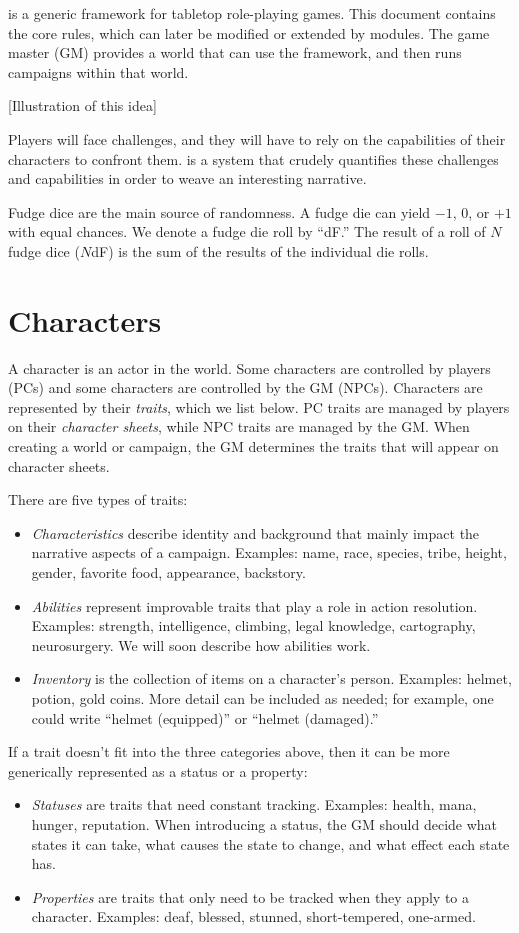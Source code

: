 \peupfudge{} is a generic framework for tabletop role-playing games.
This document contains the core rules, which can later be modified or extended by modules.
The game master (GM) provides a world that can use the \peupfudge{} framework,
and then runs campaigns within that world. 

[Illustration of this idea]

Players will face challenges, and they will have to rely on the capabilities of their characters to confront them.
\peupfudge{} is a system that crudely quantifies these challenges and capabilities in order to weave an interesting narrative.

Fudge dice are the main source of randomness. A fudge die can yield $-1$, $0$, or $+1$ with equal chances.
We denote a fudge die roll by ``dF.'' The result of a roll of $N$ fudge dice ($N$dF) is the sum of the results of the individual die rolls.

\section{Characters}
A character is an actor in the world.
Some characters are controlled by players (PCs) and some characters are controlled by the GM (NPCs).
Characters are represented by their \emph{traits}, which we list below.
PC traits are managed by players on their \emph{character sheets}, while NPC traits are managed by the GM.
When creating a world or campaign, the GM determines the traits that will appear on character sheets.

There are five types of traits:
\begin{itemize}
\item
\emph{Characteristics} describe identity and background that mainly impact the narrative aspects of a campaign.
Examples: name, race, species, tribe, height, gender, favorite food, appearance, backstory.
\item
\emph{Abilities} represent improvable traits that play a role in action resolution.
Examples: strength, intelligence, climbing, legal knowledge, cartography, neurosurgery.
We will soon describe how abilities work.
\item
\emph{Inventory} is the collection of items on a character’s person.
Examples: helmet, potion, gold coins.
More detail can be included as needed; for example, one could write ``helmet (equipped)'' or ``helmet (damaged).''
\end{itemize}
If a trait doesn’t fit into the three categories above, then it can be more generically represented as a status or a property:
\begin{itemize}
\item
\emph{Statuses} are traits that need constant tracking.
Examples: health, mana, hunger, reputation.
When introducing a status, the GM should decide what states it can take, what causes the state to change, and what effect each state has.
\item
\emph{Properties} are traits that only need to be tracked when they apply to a character.
Examples: deaf, blessed, stunned, short-tempered, one-armed.
\end{itemize}

